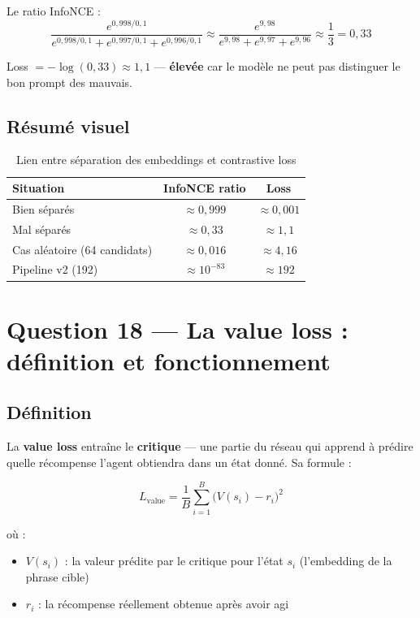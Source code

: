 \documentclass[11pt,a4paper]{article}
\begin{document}
Le ratio InfoNCE :
\begin{equation}
\frac{e^{0{,}998/0{,}1}}{e^{0{,}998/0{,}1} + e^{0{,}997/0{,}1} + e^{0{,}996/0{,}1}} \approx \frac{e^{9{,}98}}{e^{9{,}98} + e^{9{,}97} + e^{9{,}96}} \approx \frac{1}{3} = 0{,}33
\end{equation}

Loss $= -\log(0{,}33) \approx 1{,}1$ — \textbf{élevée} car le modèle ne peut pas distinguer le bon prompt des mauvais.

\subsection{Résumé visuel}

\begin{table}[h]
\centering
\begin{tabular}{lcc}
\toprule
\textbf{Situation} & \textbf{InfoNCE ratio} & \textbf{Loss} \\
\midrule
Bien séparés & $\approx 0{,}999$ & $\approx 0{,}001$ \\
Mal séparés & $\approx 0{,}33$ & $\approx 1{,}1$ \\
Cas aléatoire (64 candidats) & $\approx 0{,}016$ & $\approx 4{,}16$ \\
Pipeline v2 (192) & $\approx 10^{-83}$ & $\approx 192$ \\
\bottomrule
\end{tabular}
\caption{Lien entre séparation des embeddings et contrastive loss}
\end{table}

\section{Question 18 — La value loss : définition et fonctionnement}

\subsection{Définition}

La \textbf{value loss} entraîne le \textbf{critique} — une partie du réseau qui apprend à prédire quelle récompense l'agent obtiendra dans un état donné. Sa formule :

\begin{equation}
L_{\text{value}} = \frac{1}{B}\sum_{i=1}^{B} \big(V(s_i) - r_i\big)^2
\end{equation}

où :
\begin{itemize}
    \item $V(s_i)$ : la valeur prédite par le critique pour l'état $s_i$ (l'embedding de la phrase cible)
    \item $r_i$ : la récompense réellement obtenue après avoir agi
\end{itemize}
\end{document}
